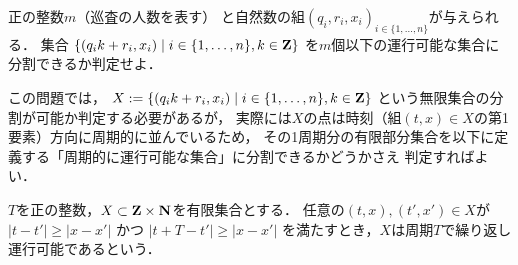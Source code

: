 \begin{timeSpecifiedProblemOnLine}
  正の整数$m$（巡査の人数を表す）
  と自然数の組$(q_i, r_i, x_i)_{ i \in \{ 1, \ldots, n \} }$が与えられる．
  集合
  $\{ (q_i k + r_i, x_i) \mid i \in \{1, \ldots, n\}, k \in \mathbf Z \}$
  を$m$個以下の運行可能な集合に分割できるか判定せよ．
\end{timeSpecifiedProblemOnLine}



この問題では，
$X := \{ (q_i k + r_i, x_i) \mid i \in \{1, \ldots, n\}, k \in \mathbf Z \}$
という無限集合の分割が可能か判定する必要があるが，
実際には$X$の点は時刻（組$(t, x) \in X$の第1要素）方向に周期的に並んでいるため，
その1周期分の有限部分集合を以下に定義する「周期的に運行可能な集合」に分割できるかどうかさえ
判定すればよい．


\begin{defi}
  $T$を正の整数，$X \subset \mathbf Z \times \mathbf N$を有限集合とする．
  任意の$(t, x), (t', x') \in X$が
  $|t - t'| \geq |x - x'|$
  かつ
  $|t + T - t'| \geq |x - x'|$
  を満たすとき，$X$は周期$T$で繰り返し運行可能であるという．
\end{defi}








